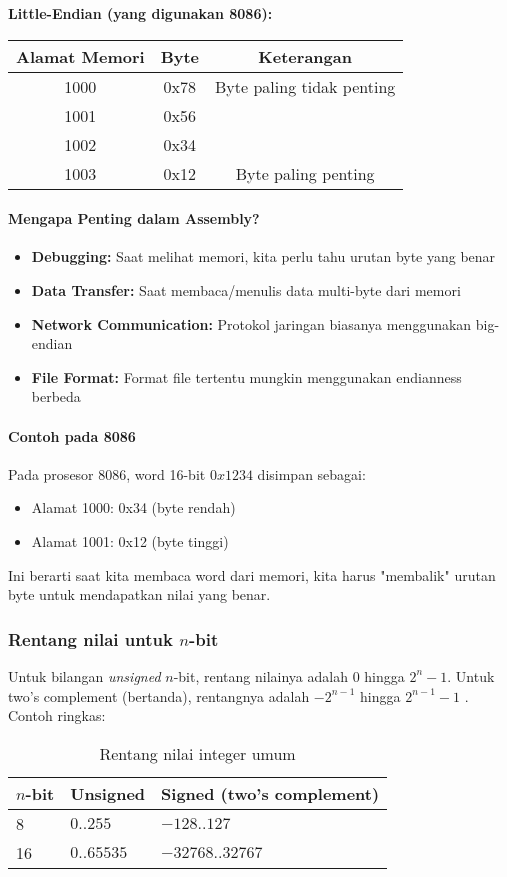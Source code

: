 \documentclass[../main.tex]{subfiles}
\begin{document}
\textbf{Little-Endian (yang digunakan 8086):}
\begin{center}
\begin{tabular}{|c|c|c|}
\hline
\textbf{Alamat Memori} & \textbf{Byte} & \textbf{Keterangan} \\
\hline
1000 & 0x78 & Byte paling tidak penting \\
1001 & 0x56 & \\
1002 & 0x34 & \\
1003 & 0x12 & Byte paling penting \\
\hline
\end{tabular}
\end{center}

\paragraph{Mengapa Penting dalam Assembly?}
\begin{itemize}
    \item \textbf{Debugging:} Saat melihat memori, kita perlu tahu urutan byte yang benar
    \item \textbf{Data Transfer:} Saat membaca/menulis data multi-byte dari memori
    \item \textbf{Network Communication:} Protokol jaringan biasanya menggunakan big-endian
    \item \textbf{File Format:} Format file tertentu mungkin menggunakan endianness berbeda
\end{itemize}

\paragraph{Contoh pada 8086}
Pada prosesor 8086, word 16-bit \(0x1234\) disimpan sebagai:
\begin{itemize}
    \item Alamat 1000: 0x34 (byte rendah)
    \item Alamat 1001: 0x12 (byte tinggi)
\end{itemize}

Ini berarti saat kita membaca word dari memori, kita harus "membalik" urutan byte untuk mendapatkan nilai yang benar.

\subsubsection{Rentang nilai untuk $n$-bit}
Untuk bilangan \textit{unsigned} $n$-bit, rentang nilainya adalah $0$ hingga $2^n-1$. Untuk two's complement (bertanda), rentangnya adalah $-2^{n-1}$ hingga $2^{n-1}-1$ \cite{wiki_binary_number,wiki_two_complement}. Contoh ringkas:
\begin{table}[h]
\centering
\caption{Rentang nilai integer umum}
\begin{tabular}{lll}
\toprule
\textbf{$n$-bit} & \textbf{Unsigned} & \textbf{Signed (two's complement)} \\
\midrule
8  & $0..255$       & $-128..127$ \\
16 & $0..65535$     & $-32768..32767$ \\
\bottomrule
\end{tabular}
\label{tab:range-nbit}
\end{table}
\end{document}
